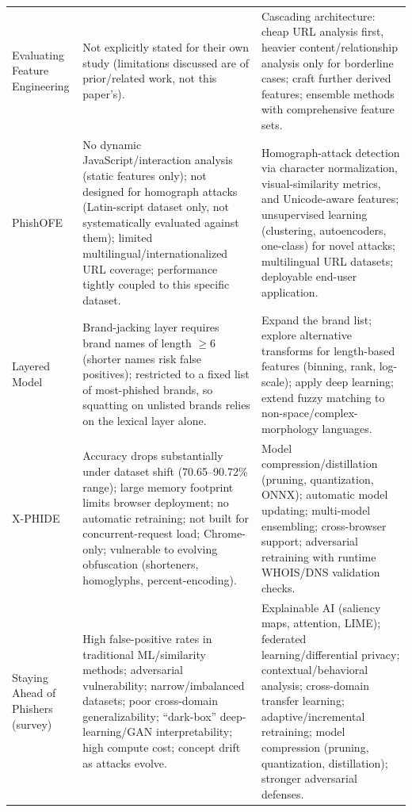 \documentclass[10pt]{article}
\begin{document}
\begin{longtable}{L{4cm} L{10.5cm} L{10.5cm}}
Evaluating Feature Engineering
 & Not explicitly stated for their own study (limitations discussed are of prior/related work, not this paper's).
 & Cascading architecture: cheap URL analysis first, heavier content/relationship analysis only for borderline cases; craft further derived features; ensemble methods with comprehensive feature sets. \\

PhishOFE
 & No dynamic JavaScript/interaction analysis (static features only); not designed for homograph attacks (Latin-script dataset only, not systematically evaluated against them); limited multilingual/internationalized URL coverage; performance tightly coupled to this specific dataset.
 & Homograph-attack detection via character normalization, visual-similarity metrics, and Unicode-aware features; unsupervised learning (clustering, autoencoders, one-class) for novel attacks; multilingual URL datasets; deployable end-user application. \\

Layered Model
 & Brand-jacking layer requires brand names of length $\geq 6$ (shorter names risk false positives); restricted to a fixed list of most-phished brands, so squatting on unlisted brands relies on the lexical layer alone.
 & Expand the brand list; explore alternative transforms for length-based features (binning, rank, log-scale); apply deep learning; extend fuzzy matching to non-space/complex-morphology languages. \\

X-PHIDE
 & Accuracy drops substantially under dataset shift (70.65--90.72\% range); large memory footprint limits browser deployment; no automatic retraining; not built for concurrent-request load; Chrome-only; vulnerable to evolving obfuscation (shorteners, homoglyphs, percent-encoding).
 & Model compression/distillation (pruning, quantization, ONNX); automatic model updating; multi-model ensembling; cross-browser support; adversarial retraining with runtime WHOIS/DNS validation checks. \\

Staying Ahead of Phishers (survey)
 & High false-positive rates in traditional ML/similarity methods; adversarial vulnerability; narrow/imbalanced datasets; poor cross-domain generalizability; ``dark-box'' deep-learning/GAN interpretability; high compute cost; concept drift as attacks evolve.
 & Explainable AI (saliency maps, attention, LIME); federated learning/differential privacy; contextual/behavioral analysis; cross-domain transfer learning; adaptive/incremental retraining; model compression (pruning, quantization, distillation); stronger adversarial defenses. \\


\end{longtable}
\end{document}

